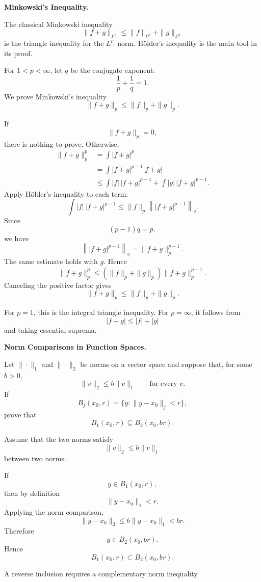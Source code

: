 \begin{problem}[CP-II-0134]
\label{prob:cp-ii-0134}
\textbf{Minkowski's Inequality.}

\hspace*{1.5em}The classical Minkowski inequality
	\[
	\|f+g\|_{L^p}
	\le
	\|f\|_{L^p} + \|g\|_{L^p}
	\]
	is the triangle inequality for the $L^p$--norm.  Hölder's inequality
	is the main tool in its proof.
\end{problem}

\begin{solution}
For \(1<p<\infty\), let \(q\) be the conjugate exponent:
\[
\frac1p+\frac1q=1.
\]
We prove Minkowski's inequality
\[
\|f+g\|_p
\le
\|f\|_p+\|g\|_p.
\]

If
\[
\|f+g\|_p=0,
\]
there is nothing to prove. Otherwise,
\[
\begin{aligned}
\|f+g\|_p^p
&=
\int |f+g|^p\\
&=
\int |f+g|^{p-1}|f+g|\\
&\le
\int |f|\,|f+g|^{p-1}
+
\int |g|\,|f+g|^{p-1}.
\end{aligned}
\]
Apply Hölder's inequality to each term:
\[
\int |f|\,|f+g|^{p-1}
\le
\|f\|_p
\left\||f+g|^{p-1}\right\|_q.
\]
Since
\[
(p-1)q=p,
\]
we have
\[
\left\||f+g|^{p-1}\right\|_q
=
\|f+g\|_p^{p-1}.
\]
The same estimate holds with \(g\). Hence
\[
\|f+g\|_p^p
\le
(\|f\|_p+\|g\|_p)
\|f+g\|_p^{p-1}.
\]
Canceling the positive factor gives
\[
\boxed{
\|f+g\|_p
\le
\|f\|_p+\|g\|_p.
}
\]

For \(p=1\), this is the integral triangle inequality. For \(p=\infty\), it follows from
\[
|f+g|\le|f|+|g|
\]
and taking essential suprema.
\end{solution}


\begin{problem}[CP-II-0140]
\label{prob:cp-ii-0140}
\textbf{Norm Comparisons in Function Spaces.}

\hspace*{1.5em}Let \(\|\cdot\|_1\) and \(\|\cdot\|_2\) be norms on a vector space and
suppose that, for some \(b>0\),
\[
\|v\|_2\le b\|v\|_1
\qquad\text{for every }v.
\]
If
\[
B_j(x_0,r)=\{y:\|y-x_0\|_j<r\},
\]
prove that
\[
B_1(x_0,r)\subseteq B_2(x_0,br).
\]
\end{problem}

\begin{solution}
Assume that the two norms satisfy
\[
\|v\|_2\le b\|v\|_1
\]
between two norms.

If
\[
y\in B_1(x_0,r),
\]
then by definition
\[
\|y-x_0\|_1<r.
\]
Applying the norm comparison,
\[
\|y-x_0\|_2
\le
b\|y-x_0\|_1
<
br.
\]
Therefore
\[
y\in B_2(x_0,br).
\]
Hence
\[
\boxed{
B_1(x_0,r)
\subset
B_2(x_0,br).
}
\]

A reverse inclusion requires a complementary norm
inequality.
\end{solution}


